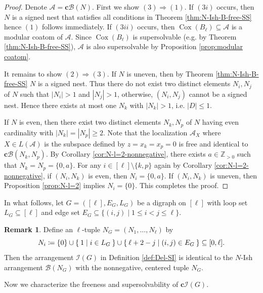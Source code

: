 \documentclass[11pt]{article}
\theoremstyle{definition}
\newtheorem{remark}[theo]{Remark}
\numberwithin{equation}{section}
\DeclareMathOperator{\Cox}{Cox}
\newcommand{\A}{\mathcal{A}}
\newcommand{\I}{\mathcal{I}}
\newcommand{\B}{\mathcal{B}}
\newcommand{\Z}{\mathbb{Z}}
\newcommand{\tbf}{\textbf}
\begin{document}
 
  \begin{proof}
Denote  $ \mathcal{A}=\tbf{c}\B(N)$.
First we show $(3) \Rightarrow (1)$.   
If  $(3i)$ occurs, then $N$ is a signed nest that satisfies all conditions in Theorem \ref{thm:N-Ish-B-free-SS} hence $(1)$ follows immediately. 
If  $(3ii)$ occurs, then $\Cox(B_\ell)\subseteq \A$ is a modular coatom of $\A$. 
Since $\Cox(B_\ell)$ is supersolvable (e.g. by Theorem \ref{thm:N-Ish-B-free-SS}), $\A$ is also supersolvable by Proposition \ref{prop:modular coatom}. 
  
It remains to show  $(2) \Rightarrow (3)$. 
If $N$ is uneven, then by Theorem \ref{thm:N-Ish-B-free-SS} $N$ is a signed nest.
Thus there do not exist two distinct elements $N_i, N_j$ of $N$ such that $| N_i|>1$ and $| N_j |>1$, otherwise, $(N_i, N_j)$ cannot be a signed nest. 
Hence there exists at most one  $N_k$ with $| N_k |>1$, i.e. $| D | \le 1 $.

If $N$ is even, then there exist two distinct elements $N_k, N_p$ of $N$ having even cardinality with $|N_k| = |N_p| \ge 2$. 
Note that the localization $\A_X$ where $X\in L(\A)$ is the subspace defined by $z=x_{k}=x_p=0$ is free and identical to $\tbf{c}\B(N_k, N_p)$. 
By Corollary \ref{cor:N-l=2-nonnegative}, there exists $a \in \Z_{>0}$ such that $N_k = N_p =\{0,a\}$.
For any $i \in [\ell]\setminus\{k,p\}$ again by Corollary \ref{cor:N-l=2-nonnegative}, if $(N_i, N_k)$ is even, then $N_i =\{0,a\}$. 
If $(N_i, N_k)$ is uneven, then Proposition \ref{prop:N-l=2} implies $N_i =\{0\}$. 
This completes the proof.
 \end{proof} 
 
 
 In what follows,  let $G=([\ell],E_G,L_G)$ be a digraph on $[\ell]$ with loop set  $L_G\subseteq[\ell]$ and edge set $E_G \subseteq \{(i,j) \mid 1 \leq i < j \leq \ell\}$.  
 
  \begin{remark}
 \label{rem:IG-NI}
Define an $\ell$-tuple $N_G=(N_1, \ldots, N_\ell)$ by 
$$N_i  \coloneqq  \{0\} \cup  \Set{ 1 | i \in L_G} \cup  \Set{ \ell+2-j | (i,j) \in E_G} \subseteq [0,\ell].$$
Then the arrangement $\I(G)$ in Definition \ref{def:Del-SI} is identical to the $N$-Ish arrangement $\B(N_G)$ with the nonnegative, centered tuple  $N_G$.
\end{remark}
 


Now we characterize the freeness and supersolvability of $\tbf{c}\I(G)$.
 
\end{document}
